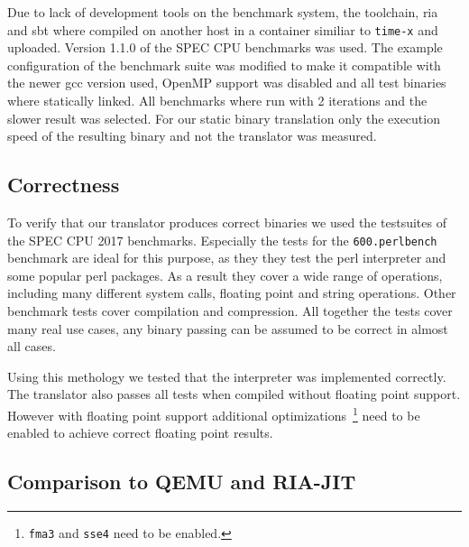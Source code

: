 \documentclass[course=eragp]{aspdoc}
\begin{document}
\par

Due to lack of development tools on the benchmark system, the toolchain, ria and sbt where compiled on another host in a container similiar to \texttt{time-x} and uploaded. %
Version 1.1.0 of the SPEC CPU benchmarks was used.
The example configuration of the benchmark suite was modified to make it compatible with the newer gcc version used, OpenMP support was disabled and all test binaries where statically linked.
All benchmarks where run with 2 iterations and the slower result was selected.
For our static binary translation only the execution speed of the resulting binary and not the translator was measured.

\subsection{Correctness}

To verify that our translator produces correct binaries we used the testsuites of the SPEC CPU 2017 benchmarks.
Especially the tests for the \texttt{600.perlbench} benchmark are ideal for this purpose, as they they test the perl interpreter and some popular perl packages.
As a result they cover a wide range of operations, including many different system calls, floating point and string operations.
Other benchmark tests cover compilation and compression.
All together the tests cover many real use cases, any binary passing can be assumed to be correct in almost all cases.

\par

Using this methology we tested that the interpreter was implemented correctly.
The translator also passes all tests when compiled without floating point support.
However with floating point support additional optimizations~\footnote{\texttt{fma3} and \texttt{sse4} need to be enabled.} need to be enabled to achieve correct floating point results.

\subsection{Comparison to QEMU and RIA-JIT}
\end{document}
